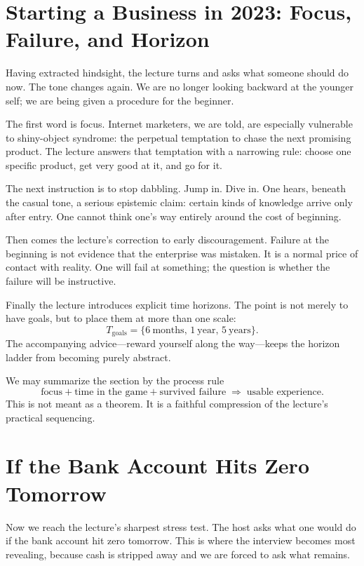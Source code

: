 \section{Starting a Business in 2023: Focus, Failure, and Horizon}

Having extracted hindsight, the lecture turns and asks what someone should do now. The tone changes again. We are no longer looking backward at the younger self; we are being given a procedure for the beginner.

The first word is focus. Internet marketers, we are told, are especially vulnerable to shiny-object syndrome: the perpetual temptation to chase the next promising product. The lecture answers that temptation with a narrowing rule: choose one specific product, get very good at it, and go for it.

The next instruction is to stop dabbling. Jump in. Dive in. One hears, beneath the casual tone, a serious epistemic claim: certain kinds of knowledge arrive only after entry. One cannot think one's way entirely around the cost of beginning.

Then comes the lecture's correction to early discouragement. Failure at the beginning is not evidence that the enterprise was mistaken. It is a normal price of contact with reality. One will fail at something; the question is whether the failure will be instructive.

Finally the lecture introduces explicit time horizons. The point is not merely to have goals, but to place them at more than one scale:
\begin{equation}
T_{\mathrm{goals}}=\{6\ \mathrm{months},\,1\ \mathrm{year},\,5\ \mathrm{years}\}.
\end{equation}
The accompanying advice---reward yourself along the way---keeps the horizon ladder from becoming purely abstract.

We may summarize the section by the process rule
\begin{equation}
\text{focus} + \text{time in the game} + \text{survived failure}
\;\Longrightarrow\;
\text{usable experience}.
\end{equation}
This is not meant as a theorem. It is a faithful compression of the lecture's practical sequencing.

\section{If the Bank Account Hits Zero Tomorrow}

Now we reach the lecture's sharpest stress test. The host asks what one would do if the bank account hit zero tomorrow. This is where the interview becomes most revealing, because cash is stripped away and we are forced to ask what remains.

